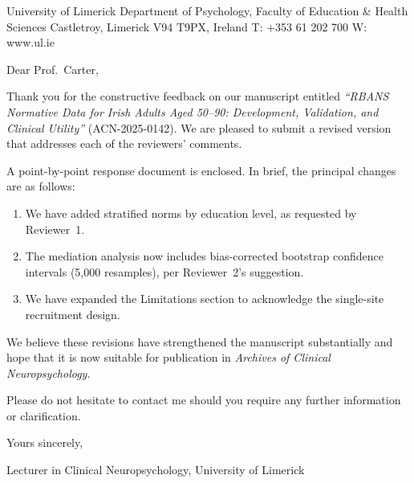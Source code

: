 \documentclass[palette=slate]{rossletter}
\begin{document}
  {}%
  {University of Limerick}
  {Department of Psychology, Faculty of Education \& Health Sciences}
  {Castletroy, Limerick V94 T9PX, Ireland \quad
   T: +353 61 202 700 \quad W: www.ul.ie}

\opening{Dear Prof.\ Carter,}

Thank you for the constructive feedback on our manuscript entitled
\textit{``RBANS Normative Data for Irish Adults Aged 50--90: Development,
Validation, and Clinical Utility''} (ACN-2025-0142). We are pleased to
submit a revised version that addresses each of the reviewers' comments.

A point-by-point response document is enclosed. In brief, the principal
changes are as follows:

\begin{enumerate}
  \item We have added stratified norms by education level, as requested
        by Reviewer~1.
  \item The mediation analysis now includes bias-corrected bootstrap
        confidence intervals (5,000 resamples), per Reviewer~2's
        suggestion.
  \item We have expanded the Limitations section to acknowledge the
        single-site recruitment design.
\end{enumerate}

We believe these revisions have strengthened the manuscript substantially
and hope that it is now suitable for publication in
\textit{Archives of Clinical Neuropsychology}.

Please do not hesitate to contact me should you require any further
information or clarification.

\closing{Yours sincerely,}

\signature
  {Dr.\ Ross A.\ Dunne}
  {Lecturer in Clinical Neuropsychology, University of Limerick}

\end{document}
